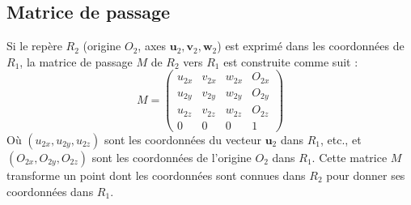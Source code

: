 \subsection{Matrice de passage}
Si le repère \( R_2 \) (origine \( O_2 \), axes \( \mathbf{u}_2, \mathbf{v}_2, \mathbf{w}_2 \)) est exprimé dans les coordonnées de \( R_1 \), la matrice de passage \( M \) de \( R_2 \) vers \( R_1 \) est construite comme suit :
\[ M = \begin{pmatrix}
u_{2x} & v_{2x} & w_{2x} & O_{2x} \\
u_{2y} & v_{2y} & w_{2y} & O_{2y} \\
u_{2z} & v_{2z} & w_{2z} & O_{2z} \\
0 & 0 & 0 & 1
\end{pmatrix} \]
Où \( (u_{2x}, u_{2y}, u_{2z}) \) sont les coordonnées du vecteur \( \mathbf{u}_2 \) dans \( R_1 \), etc., et \( (O_{2x}, O_{2y}, O_{2z}) \) sont les coordonnées de l'origine \( O_2 \) dans \( R_1 \).
Cette matrice \( M \) transforme un point dont les coordonnées sont connues dans \( R_2 \) pour donner ses coordonnées dans \( R_1 \).
